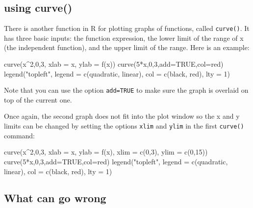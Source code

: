\documentclass[
  letterpaper,
  DIV=11,
  numbers=noendperiod]{scrreprt}
\newenvironment{Shaded}{\begin{snugshade}}{\end{snugshade}}
\newcommand{\NormalTok}[1]{\textcolor[rgb]{0.00,0.23,0.31}{#1}}
\begin{document}
\hypertarget{using-curve}{%
\subsection*{using curve()}\label{using-curve}}

There is another function in R for plotting graphs of functions, called
\texttt{curve()}. It has three basic inputs: the function expression,
the lower limit of the range of x (the independent function), and the
upper limit of the range. Here is an example:

\begin{Shaded}
\begin{Highlighting}[]
\NormalTok{curve(x\^{}2,0,3, xlab = \textquotesingle{}x\textquotesingle{}, ylab = \textquotesingle{}f(x)\textquotesingle{})}
\NormalTok{curve(5*x,0,3,add=TRUE,col=\textquotesingle{}red\textquotesingle{})}
\NormalTok{legend("topleft", legend = c(\textquotesingle{}quadratic\textquotesingle{}, \textquotesingle{}linear\textquotesingle{}), col = c(\textquotesingle{}black\textquotesingle{}, \textquotesingle{}red\textquotesingle{}), lty = 1)}
\end{Highlighting}
\end{Shaded}

Note that you can use the option \texttt{add=TRUE} to make sure the
graph is overlaid on top of the current one.

Once again, the second graph does not fit into the plot window so the x
and y limits can be changed by setting the options \texttt{xlim} and
\texttt{ylim} in the first \texttt{curve()} command:

\begin{Shaded}
\begin{Highlighting}[]
\NormalTok{curve(x\^{}2,0,3, xlab = \textquotesingle{}x\textquotesingle{}, ylab = \textquotesingle{}f(x)\textquotesingle{}, xlim = c(0,3), ylim = c(0,15))}
\NormalTok{curve(5*x,0,3,add=TRUE,col=\textquotesingle{}red\textquotesingle{})}
\NormalTok{legend("topleft", legend = c(\textquotesingle{}quadratic\textquotesingle{}, \textquotesingle{}linear\textquotesingle{}), col = c(\textquotesingle{}black\textquotesingle{}, \textquotesingle{}red\textquotesingle{}), lty = 1)}
\end{Highlighting}
\end{Shaded}

\hypertarget{what-can-go-wrong-3}{%
\subsection*{What can go wrong}\label{what-can-go-wrong-3}}
\end{document}

